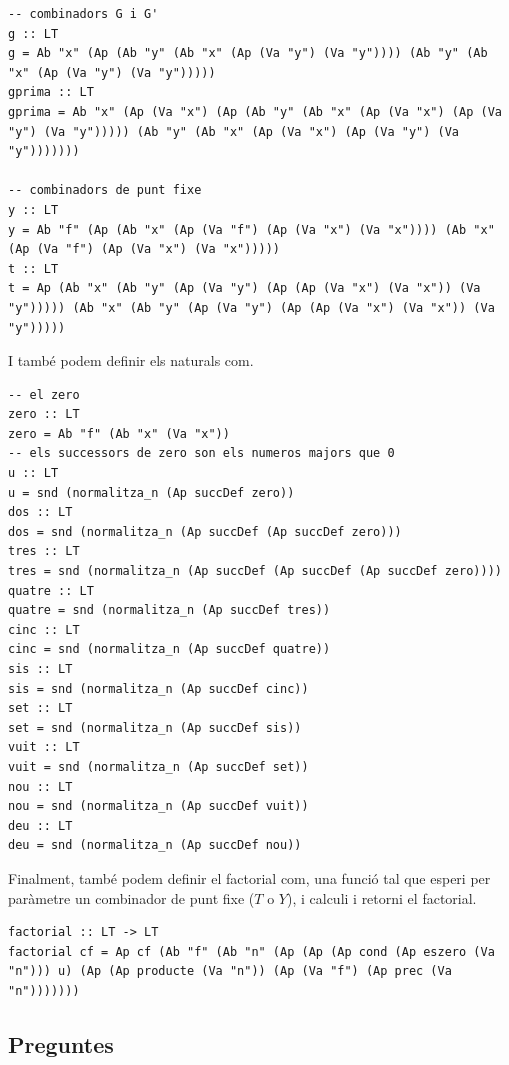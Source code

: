\documentclass[10pt,a4paper]{article}
\begin{document}
\lstset{language=Haskell, breaklines=true, basicstyle=\footnotesize}
\begin{lstlisting}[frame=mystyle]
-- combinadors G i G'
g :: LT
g = Ab "x" (Ap (Ab "y" (Ab "x" (Ap (Va "y") (Va "y")))) (Ab "y" (Ab "x" (Ap (Va "y") (Va "y")))))
gprima :: LT
gprima = Ab "x" (Ap (Va "x") (Ap (Ab "y" (Ab "x" (Ap (Va "x") (Ap (Va "y") (Va "y"))))) (Ab "y" (Ab "x" (Ap (Va "x") (Ap (Va "y") (Va "y")))))))

-- combinadors de punt fixe
y :: LT
y = Ab "f" (Ap (Ab "x" (Ap (Va "f") (Ap (Va "x") (Va "x")))) (Ab "x" (Ap (Va "f") (Ap (Va "x") (Va "x")))))
t :: LT
t = Ap (Ab "x" (Ab "y" (Ap (Va "y") (Ap (Ap (Va "x") (Va "x")) (Va "y"))))) (Ab "x" (Ab "y" (Ap (Va "y") (Ap (Ap (Va "x") (Va "x")) (Va "y")))))
\end{lstlisting}

I també podem definir els naturals com.

\lstset{language=Haskell, breaklines=true, basicstyle=\footnotesize}
\begin{lstlisting}[frame=mystyle]
-- el zero
zero :: LT
zero = Ab "f" (Ab "x" (Va "x"))
-- els successors de zero son els numeros majors que 0
u :: LT
u = snd (normalitza_n (Ap succDef zero))
dos :: LT
dos = snd (normalitza_n (Ap succDef (Ap succDef zero)))
tres :: LT
tres = snd (normalitza_n (Ap succDef (Ap succDef (Ap succDef zero))))
quatre :: LT
quatre = snd (normalitza_n (Ap succDef tres))
cinc :: LT
cinc = snd (normalitza_n (Ap succDef quatre))
sis :: LT
sis = snd (normalitza_n (Ap succDef cinc))
set :: LT
set = snd (normalitza_n (Ap succDef sis))
vuit :: LT
vuit = snd (normalitza_n (Ap succDef set))
nou :: LT
nou = snd (normalitza_n (Ap succDef vuit))
deu :: LT
deu = snd (normalitza_n (Ap succDef nou))
\end{lstlisting}

Finalment, també podem definir el factorial com, una funció tal que esperi per paràmetre un combinador de punt fixe ($T$ o $Y$), i calculi i retorni el factorial.

\lstset{language=Haskell, breaklines=true, basicstyle=\footnotesize}
\begin{lstlisting}[frame=mystyle]
factorial :: LT -> LT
factorial cf = Ap cf (Ab "f" (Ab "n" (Ap (Ap (Ap cond (Ap eszero (Va "n"))) u) (Ap (Ap producte (Va "n")) (Ap (Va "f") (Ap prec (Va "n")))))))
\end{lstlisting}

\clearpage

\subsection{Preguntes}
\end{document}
